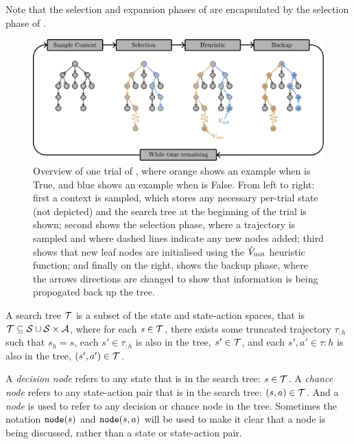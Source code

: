         Note that the selection and expansion phases of \mctsone are encapsulated by the selection phase of \thtspp.

        \begin{figure}
            \centering\includegraphics[width=1.0\textwidth]{figures/ch2/thts_trial.pdf} 
            \caption[Overview of one trial of \thtspp.]{Overview of one trial of \thtspp, where orange shows an example when \mctsmode\ewe is True, and blue shows an example when \mctsmode\ewe is False. From left to right: first a context is sampled, which stores any necessary per-trial state (not depicted) and the search tree at the beginning of the trial is shown; second shows the selection phase, where a trajectory is sampled and where dashed lines indicate any new nodes added; third shows that new leaf nodes are initialised using the ${\hat{V}_{\textnormal{init}}}$ heuristic function; and finally on the right, shows the backup phase, where the arrows directions are changed to show that information is being propogated back up the tree. }
            \label{fig:thts}
        \end{figure}

        \begin{defn}
            \label{def:search_tree}
            A \textnormal{search tree} $\mathcal{T}$ is a subset of the state and state-action spaces, that is $\mathcal{T}\subseteq \mathcal{S} \cup \mathcal{S} \times \mathcal{A}$, where for each $s\in\mathcal{T}$, there exists some truncated trajectory $\tau_{:h}$ such that $s_h = s$, each $s'\in\tau_{:h}$ is also in the tree, $s'\in\mathcal{T}$, and each $s',a'\in\tau{:h}$ is also in the tree, $(s',a')\in\mathcal{T}$.
        \end{defn}

            A \textit{decision node} refers to any state that is in the search tree: $s\in\mathcal{T}$. A \textit{chance node} refers to any state-action pair that is in the search tree: $(s,a)\in\mathcal{T}$. And a \textit{node} is used to refer to any decision or chance node in the tree. Sometimes the notation ${\textnormal{\texttt{node}}}(s)$ and ${\textnormal{\texttt{node}}}(s,a)$ will be used to make it clear that a node is being discussed, rather than a state or state-action pair.

